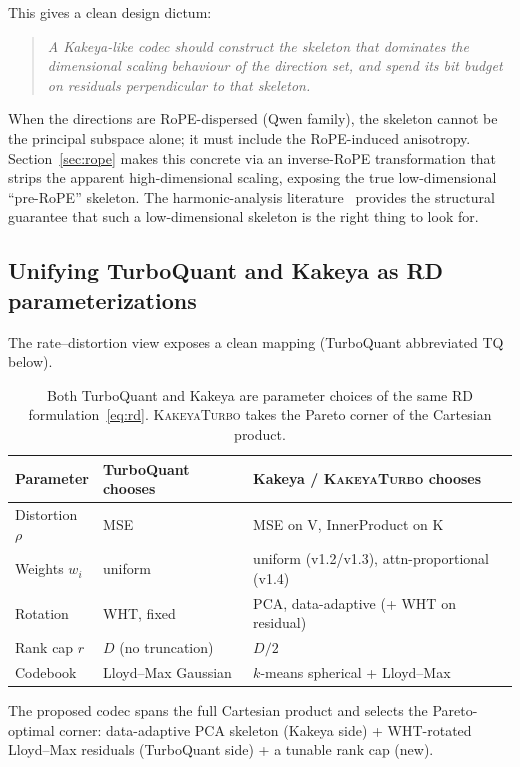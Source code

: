 \documentclass[11pt,a4paper]{article}
\theoremstyle{definition}
\theoremstyle{plain}
\begin{document}
This gives a clean design dictum:
\begin{quote}
\emph{A Kakeya-like codec should construct the skeleton that dominates the dimensional scaling behaviour of the direction set, and spend its bit budget on residuals perpendicular to that skeleton.}
\end{quote}
When the directions are RoPE-dispersed (Qwen family), the skeleton cannot be the principal subspace alone; it must include the RoPE-induced anisotropy. Section~\ref{sec:rope} makes this concrete via an inverse-RoPE transformation that strips the apparent high-dimensional scaling, exposing the true low-dimensional ``pre-RoPE'' skeleton. The harmonic-analysis literature~\cite{bourgain-kakeya,wolff-kakeya,katz-laba-tao,wang-zahl} provides the structural guarantee that such a low-dimensional skeleton is the right thing to look for.

\subsection{Unifying TurboQuant and Kakeya as RD parameterizations}

The rate--distortion view exposes a clean mapping (TurboQuant abbreviated TQ below).
\begin{table}[H]
\centering
\small
\caption{Both TurboQuant and Kakeya are parameter choices of the same RD formulation~\eqref{eq:rd}. \textsc{KakeyaTurbo} takes the Pareto corner of the Cartesian product.}
\label{tab:rd-mapping}
\begin{tabular}{lll}
  \toprule
  Parameter & TurboQuant chooses & Kakeya / \textsc{KakeyaTurbo} chooses \\
  \midrule
  Distortion $\rho$ & MSE & MSE on V, InnerProduct on K \\
  Weights $w_i$ & uniform & uniform (v1.2/v1.3), attn-proportional (v1.4) \\
  Rotation & WHT, fixed & PCA, data-adaptive (+ WHT on residual) \\
  Rank cap $r$ & $D$ (no truncation) & $D/2$ \\
  Codebook & Lloyd--Max Gaussian & $k$-means spherical + Lloyd--Max \\
  \bottomrule
\end{tabular}
\end{table}
The proposed codec spans the full Cartesian product and selects the Pareto-optimal corner: data-adaptive PCA skeleton (Kakeya side) + WHT-rotated Lloyd--Max residuals (TurboQuant side) + a tunable rank cap (new).
\end{document}
